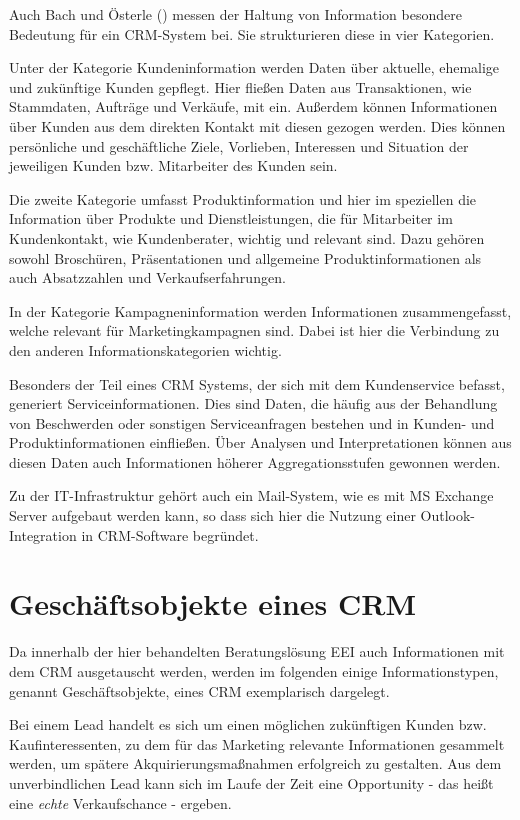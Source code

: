 Auch Bach und Österle (\citeyear[S.27-28]{Bach.2000}) messen der Haltung von Information besondere Bedeutung für ein \ac{CRM}-System bei. Sie strukturieren diese in vier Kategorien.

Unter der Kategorie Kundeninformation werden Daten über aktuelle, ehemalige und zukünftige Kunden gepflegt. Hier fließen Daten aus Transaktionen, wie Stammdaten, Aufträge und Verkäufe, mit ein. Außerdem können Informationen über Kunden aus dem direkten Kontakt mit diesen gezogen werden. Dies können persönliche und geschäftliche Ziele, Vorlieben, Interessen und Situation der jeweiligen Kunden bzw. Mitarbeiter des Kunden sein.

Die zweite Kategorie umfasst Produktinformation und hier im speziellen die Information über Produkte und Dienstleistungen, die für Mitarbeiter im Kundenkontakt, wie Kundenberater, wichtig und relevant sind. Dazu gehören sowohl Broschüren, Präsentationen und allgemeine Produktinformationen als auch Absatzzahlen und Verkaufserfahrungen. 

In der Kategorie Kampagneninformation werden Informationen zusammengefasst, welche relevant für Marketingkampagnen sind.  Dabei ist hier die Verbindung zu den anderen Informationskategorien wichtig.

Besonders der Teil eines \ac{CRM} Systems, der sich mit dem Kundenservice befasst, generiert  Serviceinformationen. Dies sind Daten, die häufig aus der Behandlung von Beschwerden oder sonstigen Serviceanfragen bestehen und in Kunden- und Produktinformationen einfließen.
Über Analysen und Interpretationen können aus diesen Daten auch Informationen höherer Aggregationsstufen gewonnen werden.

Zu der \ac{IT}-Infrastruktur gehört auch ein Mail-System, wie es mit \ac{MS} Exchange Server aufgebaut werden kann, so dass sich hier die Nutzung einer Outlook-Integration in \ac{CRM}-Software begründet.  

\section{Geschäftsobjekte eines CRM}

Da innerhalb der hier behandelten Beratungslösung \ac{EEI} auch Informationen mit dem CRM ausgetauscht werden, werden im folgenden einige Informationstypen, genannt Geschäftsobjekte, eines \ac{CRM} exemplarisch dargelegt. 
 
Bei einem Lead handelt es sich um einen möglichen zukünftigen Kunden \cite[S. 41]{BuckEmden.2004} bzw. Kaufinteressenten, zu dem für das Marketing relevante Informationen gesammelt werden, um spätere Akquirierungsmaßnahmen erfolgreich zu gestalten. Aus dem unverbindlichen Lead kann sich im Laufe der Zeit eine Opportunity - das heißt eine \emph{echte} Verkaufschance - ergeben. \cite[S.256-257]{BuckEmden.2004}


